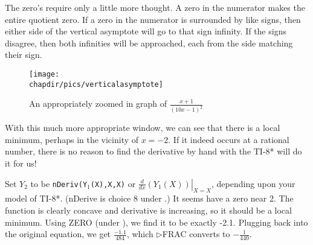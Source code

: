 The zero's require only a little more thought.  A zero in the numerator
makes the entire quotient zero.  If a zero in the numerator is surrounded by
like signs, then either side of the vertical asymptote will go to that sign infinity.
If the signs disagree, then both infinities will be approached, each from the
side matching their sign.

\begin{figure}
\begin{centering}
\texttt{[image: \\chapdir/pics/verticalasymptote]}
\caption{An appropriately zoomed in graph of $\frac{x+1}{(10x-1)^2}$}
\end{centering}
\end{figure}

With this much more appropriate window, we can see that there is a local minimum,
perhaps in the vicinity of $x=-2$.  If it indeed occurs at a rational number, there is no
reason to find the derivative by hand with the TI-8* will do it for us!

Set $Y_2$ to be \texttt{nDeriv(Y$_1$(X),X,X)} or $\left.\frac{d}{dx}(Y_1(X))\right|_{X=X}$, 
depending upon your model of TI-8*.  (nDerive is choice 8 under 
\Touche[style=function,principal=math].)  It seems have a
zero near 2.  The function is clearly concave and derivative is increasing, so it should be
a local minimum.  Using ZERO (under 
\Touche[style=function,principal=trace,fontsize=7pt,position=0.9]
), we find it to be exactly -2.1.  Plugging
back into the original equation, we get $\frac{-1.1}{484}$, which $\triangleright$FRAC
converts to $-\frac{1}{440}$.
